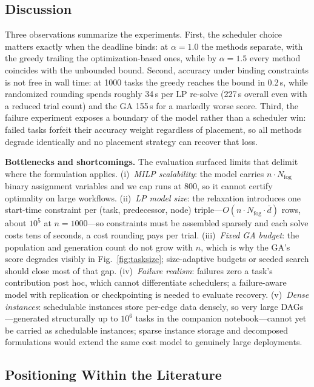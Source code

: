 \documentclass[conference]{IEEEtran}
\begin{document}
\subsection{Discussion}

Three observations summarize the experiments. First, the scheduler choice matters exactly when the deadline binds: at $\alpha=1.0$ the methods separate, with the greedy trailing the optimization-based ones, while by $\alpha=1.5$ every method coincides with the unbounded bound. Second, accuracy under binding constraints is not free in wall time: at 1000 tasks the greedy reaches the bound in 0.2\,s, while randomized rounding spends roughly 34\,s per LP re-solve (227\,s overall even with a reduced trial count) and the GA 155\,s for a markedly worse score. Third, the failure experiment exposes a boundary of the model rather than a scheduler win: failed tasks forfeit their accuracy weight regardless of placement, so all methods degrade identically and no placement strategy can recover that loss.

\textbf{Bottlenecks and shortcomings.} The evaluation surfaced limits that delimit where the formulation applies. (i)~\emph{MILP scalability}: the model carries $n \cdot N_{\mathrm{fog}}$ binary assignment variables and we cap runs at 800, so it cannot certify optimality on large workflows. (ii)~\emph{LP model size}: the relaxation introduces one start-time constraint per (task, predecessor, node) triple---$O(n \cdot N_{\mathrm{fog}} \cdot \bar{d})$ rows, about $10^5$ at $n{=}1000$---so constraints must be assembled sparsely and each solve costs tens of seconds, a cost rounding pays per trial. (iii)~\emph{Fixed GA budget}: the population and generation count do not grow with $n$, which is why the GA's score degrades visibly in Fig.~\ref{fig:tasksize}; size-adaptive budgets or seeded search should close most of that gap. (iv)~\emph{Failure realism}: failures zero a task's contribution post hoc, which cannot differentiate schedulers; a failure-aware model with replication or checkpointing is needed to evaluate recovery. (v)~\emph{Dense instances}: schedulable instances store per-edge data densely, so very large DAGs---generated structurally up to $10^6$ tasks in the companion notebook---cannot yet be carried as schedulable instances; sparse instance storage and decomposed formulations would extend the same cost model to genuinely large deployments.

\subsection{Positioning Within the Literature}
\end{document}
